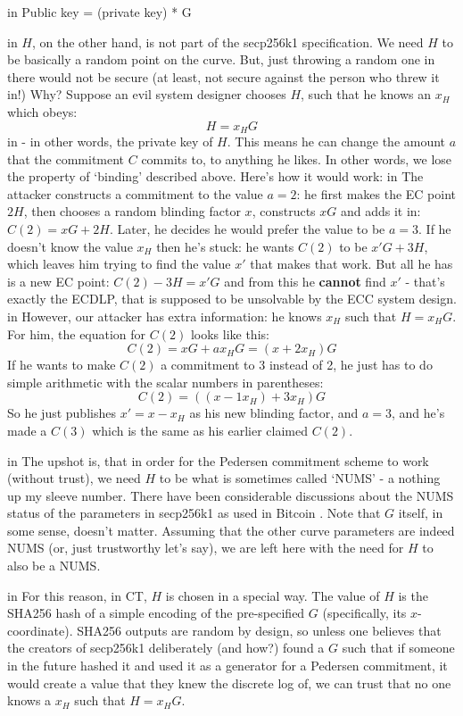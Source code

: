 \documentclass[10pt,a4paper]{article}
\begin{document}
 in \noindent Public key = (private key) * G

 in \noindent $H$, on the other hand, is not part of the secp256k1 specification. We need $H$ to be basically a random point on the curve. But, just throwing a random one in there would not be secure (at least, not secure against the person who threw it in!) Why? Suppose an evil system designer chooses $H$, such that he knows an $x_H$ which obeys:
\[H = x_H G \]
 in \noindent - in other words, the private key of $H$. This means he can change the amount $a$ that the commitment $C$ commits to, to anything he likes. In other words, we lose the property of `binding' described above. Here's how it would work:
 in \noindent The attacker constructs a commitment to the value $a=2$: he first makes the EC point $2H$, then chooses a random blinding factor $x$, constructs $xG$ and adds it in: $C(2) = xG + 2H$. Later, he decides he would prefer the value to be $a=3$. If he doesn't know the value $x_H$ then he's stuck: he wants $C(2)$ to be $x'G + 3H$, which leaves him trying to find the value $x'$ that makes that work. But all he has is a new EC point: $C(2)-3H = x'G$ and from this he \textbf{cannot} find $x'$ - that's exactly the ECDLP, that is supposed to be unsolvable by the ECC system design.
 in \noindent However, our attacker has extra information: he knows $x_H$ such that $H = x_H G$. For him, the equation for $C(2)$ looks like this:
\[C(2) = xG + ax_{H}G = \left(x+2x_{H}\right)G \]
If he wants to make $C(2)$ a commitment to 3 instead of 2, he just has to do simple arithmetic with the scalar numbers in parentheses:
\[C(2) = \left(\left(x-1x_{H}\right) + 3x_{H}\right)G \]
So he just publishes $x' = x-x_H$ as his new blinding factor, and $a=3$, and he's made a $C(3)$ which is the same as his earlier claimed $C(2)$.

 in \noindent The upshot is, that in order for the Pedersen commitment scheme to work (without trust), we need $H$ to be what is sometimes called `NUMS' - a nothing up my sleeve number. There have been considerable discussions about the NUMS status of the parameters in secp256k1 as used in Bitcoin \cite{secp256k1_nums}. Note that $G$ itself, in some sense, doesn't matter. Assuming that the other curve parameters are indeed NUMS (or, just trustworthy let's say), we are left here with the need for $H$ to also be a NUMS.

 in \noindent For this reason, in CT, $H$ is chosen in a special way. The value of $H$ is the SHA256 hash of a simple encoding of the pre-specified $G$ (specifically, its $x$-coordinate). SHA256 outputs are random by design, so unless one believes that the creators of secp256k1 deliberately (and how?) found a $G$ such that if someone in the future hashed it and used it as a generator for a Pedersen commitment, it would create a value that they knew the discrete log of, we can trust that no one knows a $x_H$ such that $H = x_H  G$.
\end{document}
